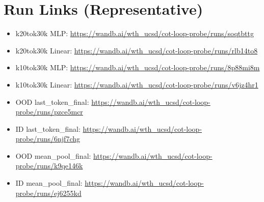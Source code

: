 \documentclass[11pt]{article}
\begin{document}
\section*{Run Links (Representative)}
\begin{itemize}
  \item k20tok30k MLP: \url{https://wandb.ai/wth_ucsd/cot-loop-probe/runs/soqtbttg}
  \item k20tok30k Linear: \url{https://wandb.ai/wth_ucsd/cot-loop-probe/runs/rlb14to8}
  \item k10tok30k MLP: \url{https://wandb.ai/wth_ucsd/cot-loop-probe/runs/8p88mi8m}
  \item k10tok30k Linear: \url{https://wandb.ai/wth_ucsd/cot-loop-probe/runs/v6jz4hr1}
  \item OOD last\_token\_final: \url{https://wandb.ai/wth_ucsd/cot-loop-probe/runs/pzce5mcr}
  \item ID last\_token\_final: \url{https://wandb.ai/wth_ucsd/cot-loop-probe/runs/6njf7chg}
  \item OOD mean\_pool\_final: \url{https://wandb.ai/wth_ucsd/cot-loop-probe/runs/k9qe146k}
  \item ID mean\_pool\_final: \url{https://wandb.ai/wth_ucsd/cot-loop-probe/runs/ej6255kd}
\end{itemize}
\end{document}
